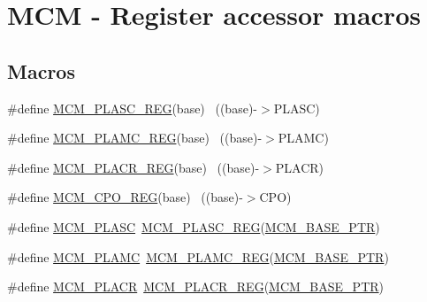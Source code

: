\hypertarget{group___m_c_m___register___accessor___macros}{}\section{M\+CM -\/ Register accessor macros}
\label{group___m_c_m___register___accessor___macros}
\subsection*{Macros}
\begin{DoxyCompactItemize}
\item 
\#define \hyperlink{group___m_c_m___register___accessor___macros_gad331cc7eeaf62bb3d0fc388993df2a8f}{M\+C\+M\+\_\+\+P\+L\+A\+S\+C\+\_\+\+R\+EG}(base)                                        ~((base)-\/$>$P\+L\+A\+SC)
\item 
\#define \hyperlink{group___m_c_m___register___accessor___macros_ga56804c4b9f516c18d994d033cae1dc30}{M\+C\+M\+\_\+\+P\+L\+A\+M\+C\+\_\+\+R\+EG}(base)                                        ~((base)-\/$>$P\+L\+A\+MC)
\item 
\#define \hyperlink{group___m_c_m___register___accessor___macros_ga17a3e9a89a16aa68153508ea00f5cbf5}{M\+C\+M\+\_\+\+P\+L\+A\+C\+R\+\_\+\+R\+EG}(base)                                        ~((base)-\/$>$P\+L\+A\+CR)
\item 
\#define \hyperlink{group___m_c_m___register___accessor___macros_ga80926cfb869ed402f949b05fc8edf56a}{M\+C\+M\+\_\+\+C\+P\+O\+\_\+\+R\+EG}(base)                                            ~((base)-\/$>$C\+PO)
\item 
\#define \hyperlink{group___m_c_m___register___accessor___macros_ga1741cb7cdef46052c2ac9e7d28fb2b53}{M\+C\+M\+\_\+\+P\+L\+A\+SC}~\hyperlink{group___m_c_m___register___accessor___macros_gad331cc7eeaf62bb3d0fc388993df2a8f}{M\+C\+M\+\_\+\+P\+L\+A\+S\+C\+\_\+\+R\+EG}(\hyperlink{group___m_c_m___peripheral_gad41e931f176c230831e3dbad45117841}{M\+C\+M\+\_\+\+B\+A\+S\+E\+\_\+\+P\+TR})
\item 
\#define \hyperlink{group___m_c_m___register___accessor___macros_ga63f36c9c5700eb5fca4fe3852e1d6dfd}{M\+C\+M\+\_\+\+P\+L\+A\+MC}~\hyperlink{group___m_c_m___register___accessor___macros_ga56804c4b9f516c18d994d033cae1dc30}{M\+C\+M\+\_\+\+P\+L\+A\+M\+C\+\_\+\+R\+EG}(\hyperlink{group___m_c_m___peripheral_gad41e931f176c230831e3dbad45117841}{M\+C\+M\+\_\+\+B\+A\+S\+E\+\_\+\+P\+TR})
\item 
\#define \hyperlink{group___m_c_m___register___accessor___macros_gaa410b4b505027d7ff0aab20f87e2c2a5}{M\+C\+M\+\_\+\+P\+L\+A\+CR}~\hyperlink{group___m_c_m___register___accessor___macros_ga17a3e9a89a16aa68153508ea00f5cbf5}{M\+C\+M\+\_\+\+P\+L\+A\+C\+R\+\_\+\+R\+EG}(\hyperlink{group___m_c_m___peripheral_gad41e931f176c230831e3dbad45117841}{M\+C\+M\+\_\+\+B\+A\+S\+E\+\_\+\+P\+TR})

\end{DoxyCompactItemize}
